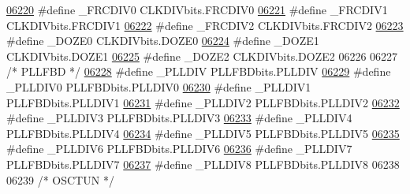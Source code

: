 \begin{DoxyCode}
\hypertarget{a00015_source_l06220}{}\hyperlink{a00015_a9ab43fc11f19f6ddf6fc844ecfd165b4}{06220} \textcolor{preprocessor}{#define \_FRCDIV0 CLKDIVbits.FRCDIV0}
\hypertarget{a00015_source_l06221}{}\hyperlink{a00015_a1a49e61fd42a8d1ca624293bbf8a760e}{06221} \textcolor{preprocessor}{#define \_FRCDIV1 CLKDIVbits.FRCDIV1}
\hypertarget{a00015_source_l06222}{}\hyperlink{a00015_ae9dcde8c8fba30bdec5f58858c2313fe}{06222} \textcolor{preprocessor}{#define \_FRCDIV2 CLKDIVbits.FRCDIV2}
\hypertarget{a00015_source_l06223}{}\hyperlink{a00015_acc952221973448382d4bd598f76ac076}{06223} \textcolor{preprocessor}{#define \_DOZE0 CLKDIVbits.DOZE0}
\hypertarget{a00015_source_l06224}{}\hyperlink{a00015_adaaeae3bdb03b9f12cd58b9551b80a5e}{06224} \textcolor{preprocessor}{#define \_DOZE1 CLKDIVbits.DOZE1}
\hypertarget{a00015_source_l06225}{}\hyperlink{a00015_a878688d85ed4c6e59958f75448d9bfd9}{06225} \textcolor{preprocessor}{#define \_DOZE2 CLKDIVbits.DOZE2}
06226 
06227 \textcolor{comment}{/* PLLFBD */}
\hypertarget{a00015_source_l06228}{}\hyperlink{a00015_acaccef84901b60613b42bd9648cfd0a9}{06228} \textcolor{preprocessor}{#define \_PLLDIV PLLFBDbits.PLLDIV}
\hypertarget{a00015_source_l06229}{}\hyperlink{a00015_a88fa75049dc79ee94352e4247e1139fc}{06229} \textcolor{preprocessor}{#define \_PLLDIV0 PLLFBDbits.PLLDIV0}
\hypertarget{a00015_source_l06230}{}\hyperlink{a00015_a4dbe285638dbd00589a87274c2373a87}{06230} \textcolor{preprocessor}{#define \_PLLDIV1 PLLFBDbits.PLLDIV1}
\hypertarget{a00015_source_l06231}{}\hyperlink{a00015_a105378467c6f05e77043e96c32b7915f}{06231} \textcolor{preprocessor}{#define \_PLLDIV2 PLLFBDbits.PLLDIV2}
\hypertarget{a00015_source_l06232}{}\hyperlink{a00015_a010cfb989a02e202a51f9528136de4cf}{06232} \textcolor{preprocessor}{#define \_PLLDIV3 PLLFBDbits.PLLDIV3}
\hypertarget{a00015_source_l06233}{}\hyperlink{a00015_a7a7063695a13642ae50d03cc9670a2cc}{06233} \textcolor{preprocessor}{#define \_PLLDIV4 PLLFBDbits.PLLDIV4}
\hypertarget{a00015_source_l06234}{}\hyperlink{a00015_ae15176fa5a8db30895a686a38e5c3daa}{06234} \textcolor{preprocessor}{#define \_PLLDIV5 PLLFBDbits.PLLDIV5}
\hypertarget{a00015_source_l06235}{}\hyperlink{a00015_af6186227926d0ab20b67a21d16b659b7}{06235} \textcolor{preprocessor}{#define \_PLLDIV6 PLLFBDbits.PLLDIV6}
\hypertarget{a00015_source_l06236}{}\hyperlink{a00015_aad0739e9d9be0f92209517ac0efdb49c}{06236} \textcolor{preprocessor}{#define \_PLLDIV7 PLLFBDbits.PLLDIV7}
\hypertarget{a00015_source_l06237}{}\hyperlink{a00015_ae973a29b6b1fe5885869e99e0d6d98d3}{06237} \textcolor{preprocessor}{#define \_PLLDIV8 PLLFBDbits.PLLDIV8}
06238 
06239 \textcolor{comment}{/* OSCTUN */}

\end{DoxyCode}
